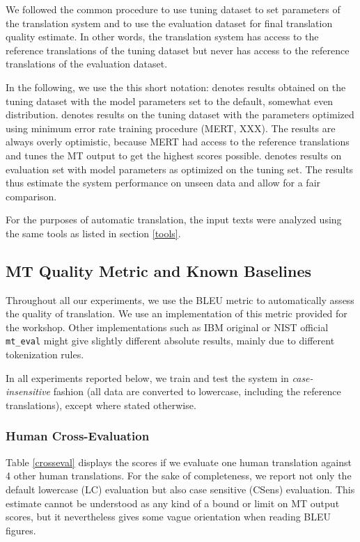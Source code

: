 \documentclass[11pt]{book}
\theoremstyle{plain}
\begin{document}
We followed the common procedure to use tuning dataset to set parameters of the
translation system and to use the evaluation dataset for final translation
quality estimate. In other words, the translation system has access to the
reference translations of the tuning dataset but never has access to the
reference translations of the evaluation dataset.

In the following, we use the this short notation:  denotes
results obtained on the tuning dataset with the model parameters set to the
default, somewhat even distribution.  denotes results on the
tuning dataset with the parameters optimized using minimum error rate training
procedure (MERT, XXX). The  results are always overly
optimistic, because MERT had access to the reference translations and tunes the
MT output to get the highest scores possible.  denotes results on evaluation set with model parameters as optimized on
the tuning set. The  results thus estimate the system
performance on unseen data and allow for a fair comparison.

For the purposes of automatic translation, the input texts were analyzed using
the same tools as listed in section \ref{tools}.



\subsection{MT Quality Metric and Known Baselines}
\label{baselines}

Throughout all our experiments, we use the BLEU metric 
to automatically assess the quality of translation. We use an implementation of
this metric provided for the workshop. Other implementations such as IBM
original or NIST official {\tt mt\_eval} might give slightly
different absolute results, mainly due to different tokenization rules.

In all experiments reported below, we train and test the system in
\emph{case-insensitive} fashion (all data are converted to lowercase, including
the reference translations), except where stated otherwise.



\subsubsection{Human Cross-Evaluation}

Table \ref{crosseval} displays the scores if we evaluate one human translation
against 4 other human translations. For the sake of completeness, we report not
only the default lowercase (LC) evaluation but also case sensitive (CSens)
evaluation. This estimate cannot be understood as any kind of a bound or limit
on MT output scores, but it nevertheless gives some vague orientation when
reading BLEU figures.
\end{document}

